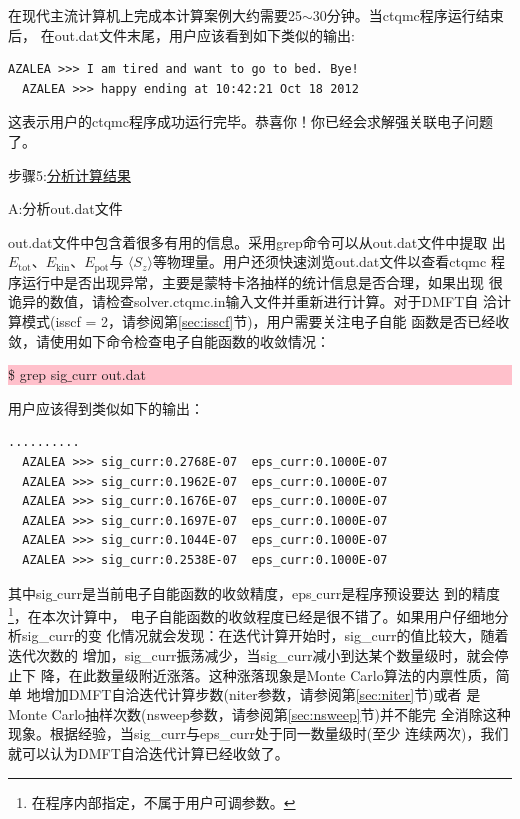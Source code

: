 在现代主流计算机上完成本计算案例大约需要25$\sim$30分钟。当ctqmc程序运行结束后，
在out.dat文件末尾，用户应该看到如下类似的输出:

\begin{lstlisting}[frame=single]
  AZALEA >>> I am tired and want to go to bed. Bye!
  AZALEA >>> happy ending at 10:42:21 Oct 18 2012
\end{lstlisting}

这表示用户的ctqmc程序成功运行完毕。恭喜你！你已经会求解强关联电子问题了。

步骤5:\underline{分析计算结果}

A:分析out.dat文件

out.dat文件中包含着很多有用的信息。采用grep命令可以从out.dat文件中提取
出$E_{\text{tot}}$、$E_{\text{kin}}$、$E_{\text{pot}}$与
$\langle S_{z} \rangle$等物理量。用户还须快速浏览out.dat文件以查看ctqmc
程序运行中是否出现异常，主要是蒙特卡洛抽样的统计信息是否合理，如果出现
很诡异的数值，请检查solver.ctqmc.in输入文件并重新进行计算。对于DMFT自
洽计算模式(isscf = 2，请参阅第\ref{sec:isscf}节)，用户需要关注电子自能
函数是否已经收敛，请使用如下命令检查电子自能函数的收敛情况：

\noindent\colorbox{pink}{\parbox[r]{\linewidth}{\quad \$ grep sig$\_$curr out.dat }}

用户应该得到类似如下的输出：
\begin{lstlisting}[frame=single]
  ..........
  AZALEA >>> sig_curr:0.2768E-07  eps_curr:0.1000E-07
  AZALEA >>> sig_curr:0.1962E-07  eps_curr:0.1000E-07
  AZALEA >>> sig_curr:0.1676E-07  eps_curr:0.1000E-07
  AZALEA >>> sig_curr:0.1697E-07  eps_curr:0.1000E-07
  AZALEA >>> sig_curr:0.1044E-07  eps_curr:0.1000E-07
  AZALEA >>> sig_curr:0.2538E-07  eps_curr:0.1000E-07
\end{lstlisting}

其中sig$\_$curr是当前电子自能函数的收敛精度，eps$\_$curr是程序预设要达
到的精度\footnote{在程序内部指定，不属于用户可调参数。}，在本次计算中，
电子自能函数的收敛程度已经是很不错了。如果用户仔细地分析sig\_curr的变
化情况就会发现：在迭代计算开始时，sig\_curr的值比较大，随着迭代次数的
增加，sig\_curr振荡减少，当sig\_curr减小到达某个数量级时，就会停止下
降，在此数量级附近涨落。这种涨落现象是Monte Carlo算法的内禀性质，简单
地增加DMFT自洽迭代计算步数(niter参数，请参阅第\ref{sec:niter}节)或者
是Monte Carlo抽样次数(nsweep参数，请参阅第\ref{sec:nsweep}节)并不能完
全消除这种现象。根据经验，当sig\_curr与eps\_curr处于同一数量级时(至少
连续两次)，我们就可以认为DMFT自洽迭代计算已经收敛了。

